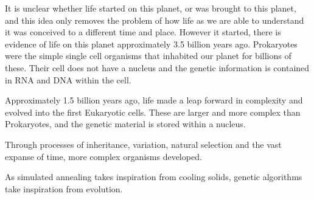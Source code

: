 It is unclear whether life started on this planet, or was brought to this planet, and this idea only removes the problem of how life as we are able to understand it was conceived to a different time and place.  However it started, there is evidence of life on this planet approximately 3.5 billion years ago.  Prokaryotes were the simple single cell organisms that inhabited our planet for billions of these.  Their cell does not have a nucleus and the genetic information is contained in RNA and DNA within the cell.

Approximately 1.5 billion years ago, life made a leap forward in complexity and evolved into the first Eukaryotic cells.  These are larger and more complex than Prokaryotes, and the genetic material is stored within a nucleus.

Through processes of inheritance, variation, natural selection and the vast expanse of time, more complex organisms developed.

As simulated annealing takes inspiration from cooling solids, genetic algorithms take inspiration from evolution.  
 


